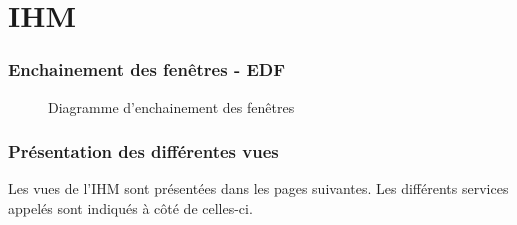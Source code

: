 \part{IHM}
\setcounter{section}{0}

\section{Enchainement des fenêtres - EDF}

\begin{figure}[H]
\noindent{}
\caption{Diagramme d'enchainement des fenêtres}
\end{figure}

\section{Présentation des différentes vues}
Les vues de l'IHM sont présentées dans les pages suivantes. Les différents services appelés sont indiqués à côté de celles-ci.





